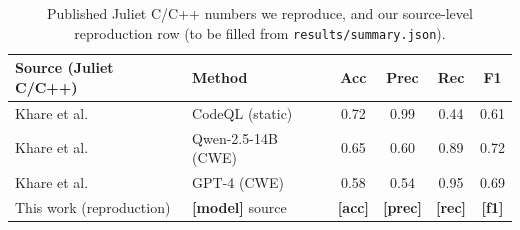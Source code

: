\documentclass[10pt]{article}
\newcommand{\placeholder}[1]{{\color{red}\textbf{[#1]}}}
\begin{document}
\begin{table}[h]
\centering
\small
\begin{tabular}{llcccc}
\toprule
Source (Juliet C/C++) & Method & Acc & Prec & Rec & F1 \\
\midrule
Khare et al.~\cite{khare2024} & CodeQL (static) & 0.72 & 0.99 & 0.44 & 0.61 \\
Khare et al.~\cite{khare2024} & Qwen-2.5-14B (CWE) & 0.65 & 0.60 & 0.89 & 0.72 \\
Khare et al.~\cite{khare2024} & GPT-4 (CWE) & 0.58 & 0.54 & 0.95 & 0.69 \\
\midrule
This work (reproduction) & \placeholder{model} source & \placeholder{acc} & \placeholder{prec} & \placeholder{rec} & \placeholder{f1} \\
\bottomrule
\end{tabular}
\caption{Published Juliet C/C++ numbers we reproduce, and our source-level
reproduction row (to be filled from \texttt{results/summary.json}).}
\label{tab:baseline}
\end{table}
\end{document}
